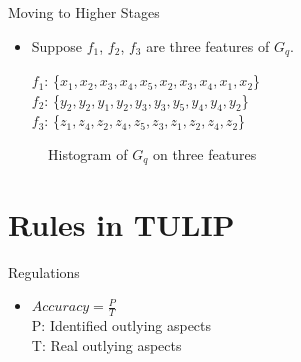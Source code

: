 \documentclass[
 size=14pt,
 paper=smartboard,  %
 mode=present, 		%
 display=slides, 	%
 style=tuliplab,  	%
 pauseslide,
 fleqn,leqno]{powerdot}
\begin{document}
\begin{slide}{Moving to Higher Stages}
\begin{itemize}
\item
\smallskip
Suppose $f_1$, $f_2$, $f_3$ are three features of $G_q$.

$f_1$: \{$x_1, x_2, x_3, x_4, x_5, x_2, x_3, x_4, x_1, x_2$\} \\

$f_2$: \{$y_2, y_2, y_1, y_2, y_3, y_3, y_5, y_4, y_4, y_2$\} \\

$f_3$: \{$z_1, z_4, z_2, z_4, z_5, z_3, z_1, z_2, z_4, z_2$\} \\
\end{itemize}

\begin{figure}[htbp]
    \centering
    \caption{Histogram of $G_q$ on three features}
    \label{fig:fre-dis-each-feature}
\end{figure}

\end{slide}


\section{Rules in TULIP}


\begin{slide}{Regulations}

\begin{center}
\begin{itemize}

\item
\smallskip
\large
{$Accuracy = \frac{P}{T}$ \\
P: Identified outlying aspects \\

T: Real outlying aspects}

\end{itemize}
\end{center}

\end{slide}
\end{document}
